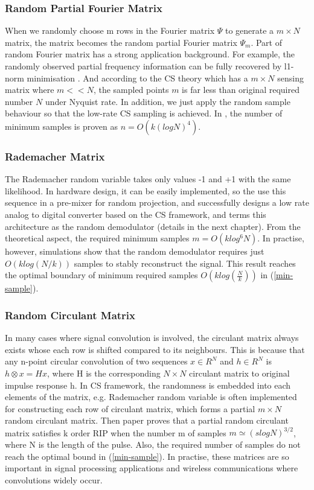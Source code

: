 \subsubsection{Random Partial Fourier Matrix}

When we randomly choose m rows in the Fourier matrix $\Psi$ to generate a $m \times N$ matrix, the matrix becomes the random partial Fourier matrix $\Psi_m$. Part of random Fourier matrix has a strong application background. For example, the randomly observed partial frequency information can be fully recovered by l1-norm minimisation \cite{candes2006near}. And according to the CS theory which has a $m \times N$ sensing matrix where $m << N$, the sampled points $m$ is far less than original required number $N$ under Nyquist rate. In addition, we just apply the random sample behaviour so that the low-rate CS sampling is achieved. In \cite{rudelson2008sparse}, the number of minimum samples is proven as $n = O (k (log N)^4)$.

\subsubsection{Rademacher Matrix}

The Rademacher random variable takes only values -1 and +1 with the same likelihood. In hardware design, it can be easily implemented, so the \cite{tropp2010beyond} use this sequence in a pre-mixer for random projection, and successfully designs a low rate analog to digital converter based on the CS framework, and terms this architecture as the random demodulator (details in the next chapter). From the theoretical aspect, the required minimum samples $m = O(k log^6 N)$. In practise, however, simulations show that the random demodulator requires just $O(klog(N/k))$ samples to stably reconstruct the signal. This result reaches the optimal boundary of minimum required samples $O(k log(\frac{N}{k}))$ in (\ref{min-sample}).

\subsubsection{Random Circulant Matrix}

In many cases where signal convolution is involved, the circulant matrix always exists whose each row is shifted compared to its neighbours. This is because that any n-point
circular convolution of two sequences $x \in R^N$ and $h \in R^N$ is $h \otimes x = Hx$, where H is the corresponding $N \times N$ circulant matrix to original impulse response h. In CS framework, the randomness is embedded into each elements of the matrix, e.g. Rademacher random variable is often implemented for constructing each row of circulant matrix, which forms a partial $m \times N$ random circulant matrix. Then paper \cite{rauhut2012restricted} proves that a partial random circulant matrix satisfies k order RIP when the number m of samples $m \simeq (slogN)^{3/2}$, where N is the length of the pulse. Also, the required number of samples do not reach the optimal bound in (\ref{min-sample}). In practise, these matrices are so important in signal processing applications and wireless communications where convolutions widely occur.

